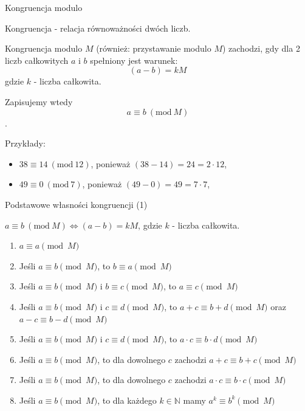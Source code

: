 \documentclass[polish,envcountsect,10pt]{beamer}
\begin{document}

\begin{frame}{Kongruencja modulo}
    \begin{definition}
    Kongruencja - relacja równoważności dwóch liczb.
    \end{definition}

    Kongruencja modulo $M$ (również: przystawanie modulo $M$) zachodzi, gdy dla 2 liczb całkowitych $a$ i $b$ spełniony jest warunek:
    \[(a - b) = kM\] gdzie $k$ - liczba całkowita.

    Zapisujemy wtedy \[ a \equiv b \ (\text{mod} \ M) \].

    Przykłady: 
    \begin{itemize}
        \item $38 \equiv 14 \ (\text{mod} \ 12)$, ponieważ $(38 - 14) = 24 = 2 \cdot 12$,
        \item $49 \equiv 0 \ (\text{mod} \ 7)$, ponieważ $(49 - 0) = 49 = 7 \cdot 7$,
    \end{itemize}

\end{frame}
%   

\begin{frame}{Podstawowe własności kongruencji (1)}
    \begin{definition}
    $ a \equiv b \ (\text{mod} \ M) \Leftrightarrow (a - b) = kM $, gdzie $k$ - liczba całkowita.
    \end{definition}

    \begin{enumerate}
        \item $a \equiv a \pmod{M}$
        \item Jeśli $a \equiv b \pmod{M}$, to $b \equiv a \pmod{M}$
        \item Jeśli $a \equiv b \pmod{M}$ i $b \equiv c \pmod{M}$, to $a \equiv c \pmod{M}$
        \item Jeśli $a \equiv b \pmod{M}$ i $c \equiv d \pmod{M}$, to $a+c \equiv b+d \pmod{M}$ oraz $a-c \equiv b-d \pmod{M}$
        \item Jeśli $a \equiv b \pmod{M}$ i $c \equiv d \pmod{M}$, to $a\cdot c \equiv b\cdot d \pmod{M}$
        \item Jeśli $a \equiv b \pmod{M}$, to dla dowolnego $c$ zachodzi $a+c \equiv b+c \pmod{M}$ 
        \item Jeśli $a \equiv b \pmod{M}$, to dla dowolnego $c$ zachodzi $a\cdot c \equiv b\cdot c \pmod{M}$
        \item Jeśli $a \equiv b \pmod{M}$, to dla każdego $k\in\mathbb{N}$ mamy $a^{k} \equiv b^{k} \pmod{M}$
    \end{enumerate}

\end{frame}
%   
\end{document}
